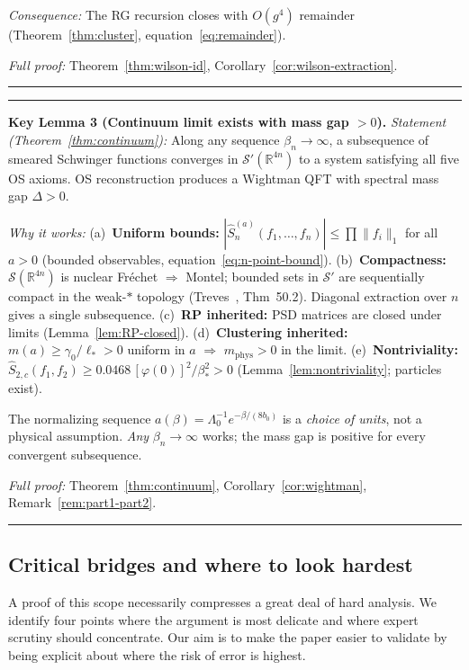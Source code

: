 \documentclass[11pt]{article}
\theoremstyle{definition}
\newcommand{\R}{\mathbb{R}}
\begin{document}
\emph{Consequence:}
The RG recursion closes with $O(g^4)$ remainder
(Theorem~\ref{thm:cluster}, equation~\eqref{eq:remainder}).

\emph{Full proof:}
Theorem~\ref{thm:wilson-id},
Corollary~\ref{cor:wilson-extraction}.
\smallskip\hrule\medskip

\medskip\noindent\hrule\smallskip
\textbf{Key Lemma 3 (Continuum limit exists with mass gap $>0$).}
\emph{Statement (Theorem~\ref{thm:continuum}):}
Along any sequence $\beta_n\to\infty$, a subsequence of
smeared Schwinger functions converges in
$\mathcal{S}'(\R^{4n})$ to a system satisfying all five
OS axioms.  OS reconstruction produces a Wightman QFT
with spectral mass gap $\Delta>0$.

\emph{Why it works:}
(a)~\textbf{Uniform bounds:}
$|\hat S_n^{(a)}(f_1,\ldots,f_n)|\le\prod\|f_i\|_1$
for all $a>0$ (bounded observables,
equation~\eqref{eq:n-point-bound}).
(b)~\textbf{Compactness:}
$\mathcal{S}(\R^{4n})$ is nuclear Fr\'echet $\Rightarrow$ Montel;
bounded sets in $\mathcal{S}'$ are sequentially compact
in the weak-$*$ topology
(Treves~\cite{Treves}, Thm~50.2).
Diagonal extraction over $n$ gives a single subsequence.
(c)~\textbf{RP inherited:} PSD matrices are closed
under limits (Lemma~\ref{lem:RP-closed}).
(d)~\textbf{Clustering inherited:}
$m(a)\ge\gamma_0/\ell_*>0$ uniform in $a$
$\Rightarrow$ $m_{\mathrm{phys}}>0$ in the limit.
(e)~\textbf{Nontriviality:}
$\hat S_{2,c}(f_1,f_2)\ge 0.0468\,[\varphi(0)]^2/\beta_*^2>0$
(Lemma~\ref{lem:nontriviality}; particles exist).

The normalizing sequence $a(\beta)=\Lambda_0^{-1}
e^{-\beta/(8b_0)}$ is a \emph{choice of units}, not a
physical assumption.  \emph{Any} $\beta_n\to\infty$ works;
the mass gap is positive for every convergent subsequence.

\emph{Full proof:}
Theorem~\ref{thm:continuum},
Corollary~\ref{cor:wightman},
Remark~\ref{rem:part1-part2}.
\smallskip\hrule\medskip

\subsection{Critical bridges and where to look hardest}%
\label{subsec:critical-bridges}

A proof of this scope necessarily compresses a great deal of
hard analysis.  We identify four points where the argument
is most delicate and where expert scrutiny should
concentrate.  Our aim is to make the paper easier to
validate by being explicit about where the risk of error
is highest.
\end{document}
